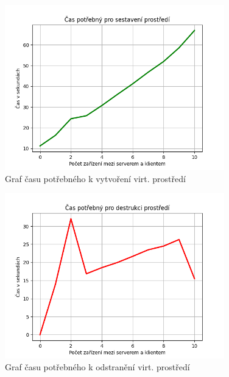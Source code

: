 \begin{figure}[H]
    \centering 
    \includegraphics[width=0.85\textwidth]{assets/img/graphs/graph_start.png}
    \caption{Graf času potřebného k vytvoření virt. prostředí}
    \label{fig:graph_create}
\end{figure}



\begin{figure}[H]
    \centering 
    \includegraphics[width=0.85\textwidth]{assets/img/graphs/graph_remove.png}
    \caption{Graf času potřebného k odstranění virt. prostředí}
    \label{fig:graph_remove}
\end{figure}